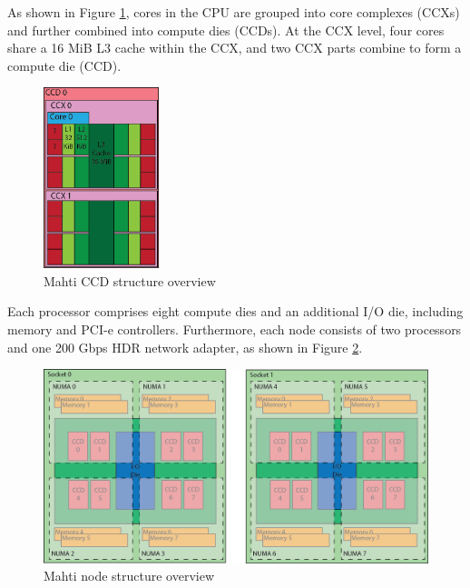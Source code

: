 

As shown in Figure \ref{fig_mahti_ccd}, cores in the CPU are grouped into core complexes (CCXs) and further combined into compute dies (CCDs). At the CCX level, four cores share a 16 MiB L3 cache within the CCX, and two CCX parts combine to form a compute die (CCD).

\begin{figure}[H]
    \centering
    \includegraphics[width=0.3\textwidth]{figures/mahti_ccd.png}
    \caption{Mahti CCD structure overview \cite{mahti}}
    \label{fig_mahti_ccd}
\end{figure}

Each processor comprises eight compute dies and an additional I/O die, including memory and PCI-e controllers. Furthermore, each node consists of two processors and one 200 Gbps HDR network adapter, as shown in Figure \ref{fig_mahti_node}.

\begin{figure}[H]
    \centering
    \includegraphics[width=1\textwidth]{figures/mahti_node.png}
    \caption{Mahti node structure overview \cite{mahti}}
    \label{fig_mahti_node}
\end{figure}


